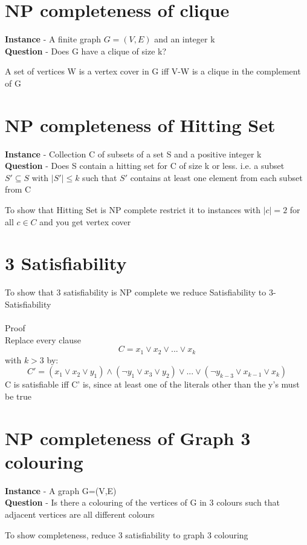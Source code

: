 \documentclass{article}[18pt]
\begin{document}
\section{NP completeness of clique}
\begin{problem}[Clique]
\textbf{Instance} - A finite graph $G=(V,E)$ and an integer k\\
\textbf{Question} - Does G have a clique of size k?
\end{problem}
A set of vertices W is a vertex cover in G iff V-W is a clique in the complement of G
\section{NP completeness of Hitting Set}
\begin{problem}
\textbf{Instance} - Collection C of subsets of a set S and a positive integer k\\
\textbf{Question} - Does S contain a hitting set for C of size k or less. i.e. a subset $S'\subseteq S$ with $|S'|\leqslant k$ such that $S'$ contains at least one element from each subset from C 
\end{problem}
To show that Hitting Set is NP complete restrict it to instances with $|c|=2$ for all $c\in C$ and you get vertex cover
\section{3 Satisfiability}
To show that 3 satisfiability is NP complete we reduce Satisfiability to 3-Satisfiability\\
\\
Proof\\
Replace every clause
$$C=x_1\lor x_2 \lor ... \lor x_k$$
with $k>3$ by:
$$C'=(x_1\lor x_2 \lor y_1) \land (\lnot y_1 \lor x_3 \lor y_2) \lor ... \lor (\lnot y_{k-3} \lor x_{k-1} \lor x_k)$$
C is satisfiable iff C' is, since at least one of the literals other than the y's must be true
\section{NP completeness of Graph 3 colouring}
\begin{problem}
\textbf{Instance} - A graph G=(V,E)\\
\textbf{Question} - Is there a colouring of the vertices of G in 3 colours such that adjacent vertices are all different colours
\end{problem}
To show completeness, reduce 3 satisfiability to graph 3 colouring
\end{document}

